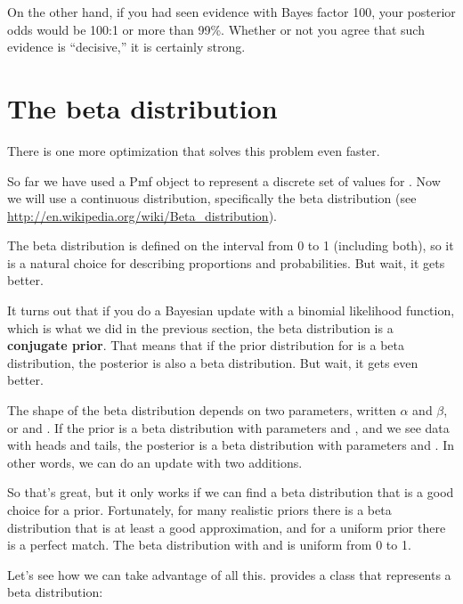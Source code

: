\documentclass[12pt]{book}
\theoremstyle{exercise}
\begin{document}
On the other hand, if you had seen evidence with Bayes
factor 100, your posterior odds would be 100:1 or more than 99\%.
Whether or not you agree that such evidence is ``decisive,''
it is certainly strong.

\section{The beta distribution}
\label{beta}

There is one more optimization that solves this problem
even faster.

So far we have used a Pmf object to represent a discrete set of
values for .  Now we will use a continuous
distribution, specifically the beta distribution (see
\url{http://en.wikipedia.org/wiki/Beta_distribution}).

The beta distribution is defined on the interval from 0 to 1
(including both), so it is a natural choice for describing
proportions and probabilities.  But wait, it gets better.


It turns out that if you do a Bayesian update with a binomial
likelihood function, which is what we did in the previous section, the beta
distribution is a {\bf conjugate prior}.  That means that if the prior
distribution for  is a beta distribution, the posterior is also
a beta distribution.  But wait, it gets even better.

The shape of the beta distribution depends on two parameters, written
$\alpha$ and $\beta$, or  and .  If the prior
is a beta distribution with parameters  and , and
we see data with  heads and  tails, the posterior is a
beta distribution with parameters  and .  In
other words, we can do an update with two additions.

So that's great, but it only works if we can find a beta distribution
that is a good choice for a prior.  Fortunately, for many realistic
priors there is a beta distribution that is at least a good
approximation, and for a uniform prior there is a perfect match.  The
beta distribution with  and  is uniform from
0 to 1.

Let's see how we can take advantage of all this.  
 provides 
a class that represents a beta distribution:
\end{document}

